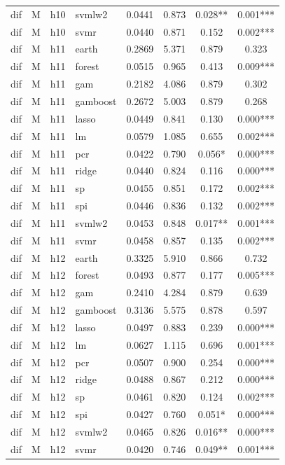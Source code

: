 \begin{ThreePartTable}
\begin{longtable}[t]{llclcccc}
dif & M & h10 & svmlw2 & 0.0441 & 0.873 & 0.028** & 0.001***\\
dif & M & h10 & svmr & 0.0440 & 0.871 & 0.152 & 0.002***\\
\addlinespace
dif & M & h11 & earth & 0.2869 & 5.371 & 0.879 & 0.323\\
dif & M & h11 & forest & 0.0515 & 0.965 & 0.413 & 0.009***\\
dif & M & h11 & gam & 0.2182 & 4.086 & 0.879 & 0.302\\
dif & M & h11 & gamboost & 0.2672 & 5.003 & 0.879 & 0.268\\
dif & M & h11 & lasso & 0.0449 & 0.841 & 0.130 & 0.000***\\
dif & M & h11 & lm & 0.0579 & 1.085 & 0.655 & 0.002***\\
dif & M & h11 & pcr & 0.0422 & 0.790 & 0.056* & 0.000***\\
dif & M & h11 & ridge & 0.0440 & 0.824 & 0.116 & 0.000***\\
dif & M & h11 & sp & 0.0455 & 0.851 & 0.172 & 0.002***\\
dif & M & h11 & spi & 0.0446 & 0.836 & 0.132 & 0.002***\\
dif & M & h11 & svmlw2 & 0.0453 & 0.848 & 0.017** & 0.001***\\
dif & M & h11 & svmr & 0.0458 & 0.857 & 0.135 & 0.002***\\
\addlinespace
dif & M & h12 & earth & 0.3325 & 5.910 & 0.866 & 0.732\\
dif & M & h12 & forest & 0.0493 & 0.877 & 0.177 & 0.005***\\
dif & M & h12 & gam & 0.2410 & 4.284 & 0.879 & 0.639\\
dif & M & h12 & gamboost & 0.3136 & 5.575 & 0.878 & 0.597\\
dif & M & h12 & lasso & 0.0497 & 0.883 & 0.239 & 0.000***\\
dif & M & h12 & lm & 0.0627 & 1.115 & 0.696 & 0.001***\\
dif & M & h12 & pcr & 0.0507 & 0.900 & 0.254 & 0.000***\\
dif & M & h12 & ridge & 0.0488 & 0.867 & 0.212 & 0.000***\\
dif & M & h12 & sp & 0.0461 & 0.820 & 0.124 & 0.002***\\
dif & M & h12 & spi & 0.0427 & 0.760 & 0.051* & 0.000***\\
dif & M & h12 & svmlw2 & 0.0465 & 0.826 & 0.016** & 0.000***\\
dif & M & h12 & svmr & 0.0420 & 0.746 & 0.049** & 0.001***\\

\end{longtable}
\end{ThreePartTable}
